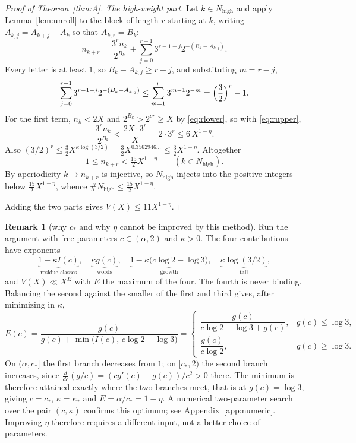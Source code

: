 \documentclass[11pt,reqno]{amsart}
\theoremstyle{plain}
\theoremstyle{definition}
\newtheorem{remark}[theorem]{Remark}
\numberwithin{equation}{section}
\begin{document}
\begin{proof}[Proof of Theorem~\textup{\ref{thm:A}}]
\smallskip
\emph{The high-weight part.}  Let $k\in N_{\mathrm{high}}$ and apply
Lemma~\ref{lem:unroll} to the block of length $r$ starting at $k$, writing
$A_{k,j}=A_{k+j}-A_k$ so that $A_{k,r}=B_k$:
\[
n_{k+r}=\frac{3^rn_k}{2^{B_k}}
+\sum_{j=0}^{r-1}3^{r-1-j}2^{-(B_k-A_{k,j})} .
\]
Every letter is at least $1$, so $B_k-A_{k,j}\ge r-j$, and substituting
$m=r-j$,
\[
\sum_{j=0}^{r-1}3^{r-1-j}2^{-(B_k-A_{k,j})}
\le\sum_{m=1}^{r}3^{m-1}2^{-m}
=\Bigl(\frac32\Bigr)^{r}-1 .
\]
For the first term, $n_k<2X$ and $2^{B_k}>2^{cr}\ge X$ by \eqref{eq:rlower},
so with \eqref{eq:rupper},
\[
\frac{3^rn_k}{2^{B_k}}<\frac{2X\cdot3^r}{X}=2\cdot3^r\le6\,X^{1-\eta}.
\]
Also $(3/2)^r\le\frac32X^{\kappa\log(3/2)}=\frac32X^{0.3562946\ldots}
\le\frac32X^{1-\eta}$.  Altogether
\[
1\le n_{k+r}<\tfrac{15}2X^{1-\eta}\qquad(k\in N_{\mathrm{high}}).
\]
By aperiodicity $k\mapsto n_{k+r}$ is injective, so $N_{\mathrm{high}}$
injects into the positive integers below $\tfrac{15}2X^{1-\eta}$, whence
$\#N_{\mathrm{high}}\le\tfrac{15}2X^{1-\eta}$.

\smallskip
Adding the two parts gives $V(X)\le11X^{1-\eta}$.
\end{proof}

\begin{remark}[why $c_*$ and why $\eta$ cannot be improved by this method]
\label{rem:opt}
Run the argument with free parameters $c\in(\alpha,2)$ and $\kappa>0$.  The
four contributions have exponents
\[
\underbrace{1-\kappa I(c)}_{\text{residue classes}},\quad
\underbrace{\kappa g(c)}_{\text{words}},\quad
\underbrace{1-\kappa\bigl(c\log2-\log3\bigr)}_{\text{growth}},\quad
\underbrace{\kappa\log(3/2)}_{\text{tail}} ,
\]
and $V(X)\ll X^{E}$ with $E$ the maximum of the four.  The fourth is never
binding.  Balancing the second against the smaller of the first and third
gives, after minimizing in $\kappa$,
\[
E(c)=\frac{g(c)}{g(c)+\min\bigl(I(c),\,c\log2-\log3\bigr)}
=\begin{cases}
\dfrac{g(c)}{c\log2-\log3+g(c)}, & g(c)\le\log3,\\[2ex]
\dfrac{g(c)}{c\log2}, & g(c)\ge\log3 .
\end{cases}
\]
On $(\alpha,c_*]$ the first branch decreases from $1$; on $[c_*,2)$ the second
branch increases, since $\frac{d}{dc}(g/c)=(cg'(c)-g(c))/c^2>0$ there.  The
minimum is therefore attained exactly where the two branches meet, that is at
$g(c)=\log3$, giving $c=c_*$, $\kappa=\kappa_*$ and $E=\alpha/c_*=1-\eta$.
A numerical two-parameter search over the pair $(c,\kappa)$ confirms this
optimum; see Appendix~\ref{app:numeric}.  Improving $\eta$ therefore requires
a different input, not a better choice of parameters.
\end{remark}
\end{document}
